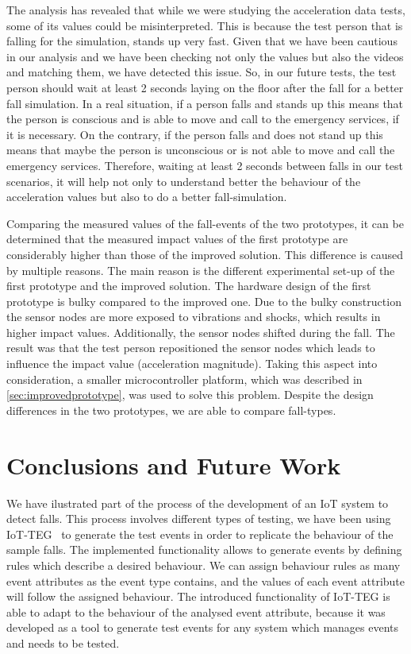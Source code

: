 \documentclass[journal]{IEEEtran}
\begin{document}
The analysis has revealed that while we were studying the acceleration data tests, some of its values could be misinterpreted.
This is because the test person that is falling for the simulation, stands up very fast. Given that we have been cautious
in our analysis and we have been checking not only the values but also the videos and matching them, we have detected
this issue. So, in our future tests, the test person should wait at least 2 seconds laying on the floor 
after the fall for a better fall simulation. In a real situation, if a
person falls and stands up this means that the person
is conscious and is able to move and call to the emergency services, if it is necessary. On the contrary, if the person
falls and does not stand up this means that maybe the person is unconscious or is not able to move and call the emergency
services. Therefore, waiting at least 2 seconds between falls in our test scenarios, it will help not only to understand 
better the behaviour of the acceleration values but also to do a better fall-simulation.

Comparing the measured values of the fall-events of the two 
prototypes, it can be determined that the measured impact values of the first prototype are considerably higher than 
those of the improved solution. This difference is caused by multiple reasons. The main reason is the different 
experimental set-up of the first prototype and the improved solution. The hardware design of the first prototype is 
bulky compared to the improved one. Due to the bulky construction the sensor nodes are more exposed to vibrations and 
shocks, which results in higher impact values. Additionally, the sensor nodes shifted during the fall. The result was 
that the test person repositioned the sensor nodes which leads to influence the impact value (acceleration magnitude). 
Taking this aspect into consideration, a smaller microcontroller
platform, which was described in \ref{sec:improvedprototype}, was used
to solve this problem. Despite the design differences in the two
prototypes,  
we are able to compare fall-types.

\section{Conclusions and Future Work}
\label{sec:conclusions}

We have ilustrated part of the process of the development of an IoT system to detect falls. This process
involves different types of testing, we have been using IoT-TEG~\cite{TesisGutierrez2017,Gutierrez2017}
to generate the test events in order to replicate the behaviour of the sample falls. The implemented functionality 
allows to generate events by defining rules which describe a desired behaviour. We can assign behaviour rules as many 
event attributes as the event type contains, and the values of each event attribute will follow the assigned behaviour.
The introduced functionality of IoT-TEG is able to adapt to the behaviour of the analysed event attribute, because
it was developed as a tool to generate test events for any system
which manages events and needs to be tested.
\end{document}
